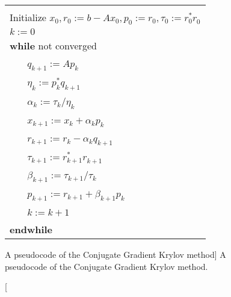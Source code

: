 \begin{figure}[t]
\begin{center}
\begin{tabular}{|l|}
\hline
\\Initialize $x_0, r_0 := b-Ax_0, p_0 := r_0, \tau_0 := r_{0}^* r_{0}^{}$
\\ $k := 0$                                                
\\ {\bf while} not converged
\\ ~~~ $q_{k+1}:=Ap_{k}$                        
\\ ~~~ $\eta_k:=p_{k}^*q_{k+1}^{}$    
\\ ~~~ $\alpha_k:=\tau_k/\eta_k$    
\\ ~~~ $x_{k+1}:=x_k+\alpha_k p_{k}$           
\\ ~~~ $r_{k+1}:=r_k-\alpha_k q_{k+1}$            
\\ ~~~ $\tau_{k+1}:= r_{k+1}^* r_{k+1}^{}$  
\\ ~~~ $\beta_{k+1}:=\tau_{k+1}/\tau_{k}$  
\\ ~~~ $p_{k+1}:= r_{k+1} + \beta_{k+1} p_k$ 

\\ ~~~ $k:=k+1$   
\\ {\bf endwhile}  
\\\hline
\end{tabular}
\end{center}
\caption
[A pseudocode of the Conjugate Gradient Krylov method]
{A pseudocode of the Conjugate Gradient Krylov method.}
\label{introduction:fig:cg}
\end{figure}


